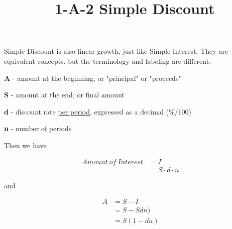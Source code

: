 \documentclass{article}
\title{\normalfont\ 1-A-2 Simple Discount} %
\date{}  %
\begin{document}
    \maketitle %

    \begin{flushleft}
        Simple Discount is also linear growth, just like Simple Interest.  They are equivalent concepts, but the terminology and labeling are different.
    \end{flushleft}

    \begin{description}
        \item\textbf{A} - amount at the beginning, or "principal" or "proceeds"
        \item\textbf{S} - amount at the end, or final amount
        \item\textbf{d} - discount rate \underline{per period}, expressed as a decimal {(\%/100)}
        \item\textbf{n} - number of periods
    \end{description}

    \begin{flushleft}
        Then we have
    \end{flushleft}

    \begin{align*}
        Amount \: of \: Interest & = I \\
        & = S \cdot d \cdot n
    \end{align*}

    \begin{flushleft}
        and
    \end{flushleft}

    \begin{align*}
        A & = S - I \\
          & = S - Sdn) \\
          & = S(1 - dn)
    \end{align*} \\

\end{document}
